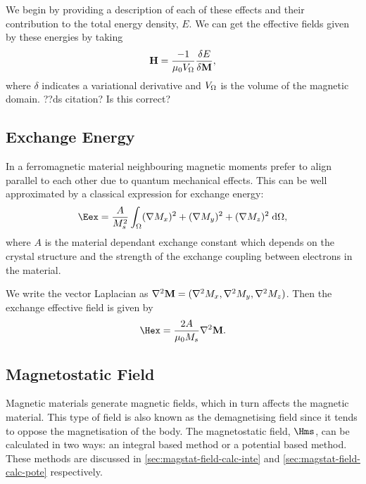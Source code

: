 We begin by providing a description of each of these effects and their contribution to the total energy density, $E$. We can get the effective fields given by these energies by taking
\begin{equation}
  \mathbf{H} = \dfrac{-1}{\mu_0 V_{\Omega}} \dfrac{\delta E}{\delta \mathbf{M}},
\end{equation}
where $\delta$ indicates a variational derivative and $V_{\Omega}$ is the volume of the magnetic domain. ??ds citation? Is this correct?


\subsection{Exchange Energy}

In a ferromagnetic material neighbouring magnetic moments prefer to align parallel to each other due to quantum mechanical effects. This can be well approximated by a classical expression for exchange energy:\cite{Aharoni1996}
\begin{equation}
  \label{eq:39}
  \Eex =  \frac{\Exchc}{M_s^2} \int_{\magd} (\nabla M_x)^2  + (\nabla M_y)^2  + (\nabla M_z)^2 \d \magd,
\end{equation}
where $A$ is the material dependant exchange constant which depends on the crystal structure and the strength of the exchange coupling between electrons in the material.

We write the vector Laplacian as $\nabla^2 \mathbf{M} = (\nabla^2 M_x,\nabla^2 M_y, \nabla^2 M_z )$. Then the exchange effective field is given by
\begin{equation}
  \label{eq:Hex}
  \Hex = \frac{2 \Exchc}{ \mu_0 M_s} \lap \Mv.
\end{equation}

\subsection{Magnetostatic Field}
\label{sec:magnetostatic-field}

Magnetic materials generate magnetic fields, which in turn affects the magnetic material. This type of field is also known as the demagnetising field since it tends to oppose the magnetisation of the body. The magnetostatic field, $\Hms$, can be calculated in two ways: an integral based method or a potential based method. These methods are discussed in \autoref{sec:magstat-field-calc-inte} and \ref{sec:magstat-field-calc-pote} respectively.

